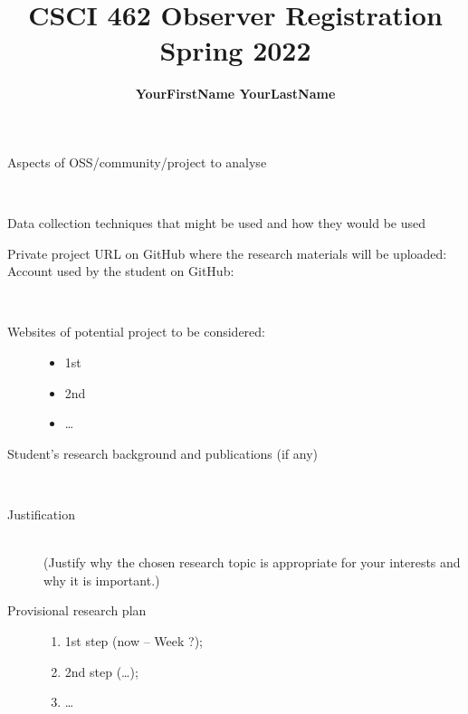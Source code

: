 \documentclass[runningheads]{llncs}
\begin{document}
%
\title{CSCI 462 Observer Registration\\Spring 2022}
%
\author{\textbf{YourFirstName YourLastName}}
%
%
%
\maketitle
%
\begin{description}
  \item[Aspects of OSS/community/project to analyse]\mbox{}\\
\end{description}
\begin{description}
  \item[Data collection techniques that might be used and how they would be used]
\end{description}
\begin{description}
  \item[Private project URL on GitHub where the research materials will be uploaded:]\mbox{}
  \item[Account used by the student on GitHub:]\mbox{}\\
  \item[Websites of potential project to be considered:]\mbox{}
     \begin{itemize}
        \item 1st
        \item 2nd
        \item\dots
     \end{itemize}
\end{description}
\begin{description}
  \item[Student's research background and publications (if any)]\mbox{}\\
\end{description}
\begin{description}
  \item[Justification]\mbox{}\\
   (Justify why the chosen research topic is appropriate for your interests and why it is important.)\\
\end{description}
\begin{description}
  \item[Provisional research plan]\mbox{}
     \begin{enumerate}
       \item 1st step (now -- Week ?);
       \item 2nd step (\dots);
       \item \dots
     \end{enumerate}
\end{description}
%
\end{document}
